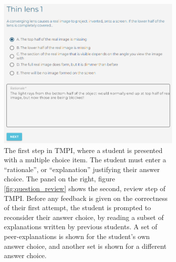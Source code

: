 \documentclass[notitlepage,12pt]{jedm}
\begin{document}
\begin{figure}[h]
	\begin{subfigure}[b]{0.45\textwidth}
		\includegraphics[width=\textwidth]{img/question_start}
		\caption{
		The first step in TMPI, where a student is presented with a 
		multiple choice item. The student must enter a ``rationale'', or 
		``explanation'' justifying their answer choice.
		\newline
		The panel on the right, figure \protect\ref{fig:question_review} shows 
		the second, review step of TMPI.
		Before any feedback is given on the correctness of their first attempt, 
		the student is prompted to reconsider their answer choice, by reading a 
		subset of explanations written by previous students.
		A set of peer-explanations is shown for the student's own answer 
		choice, and another set is shown for a different answer choice. 
		}
		\label{fig:question_start}
	\end{subfigure}
	\qquad
	\begin{subfigure}[b]{0.45\textwidth}

\end{subfigure}
\end{figure}
\end{document}
